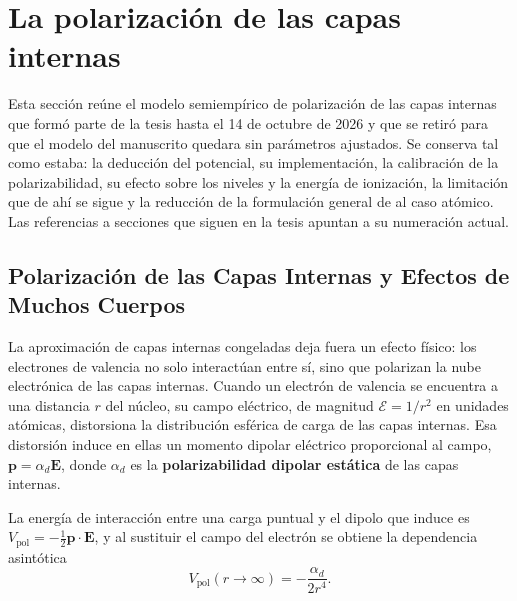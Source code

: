 
\section{La polarización de las capas internas}
\label{det:vpol}

Esta sección reúne el modelo semiempírico de polarización de las capas internas que formó parte de
la tesis hasta el 14 de octubre de 2026 y que se retiró para que el modelo del manuscrito quedara
sin parámetros ajustados. Se conserva tal como estaba: la deducción del potencial, su
implementación, la calibración de la polarizabilidad, su efecto sobre los niveles y la energía de
ionización, la limitación que de ahí se sigue y la reducción de la formulación general de
\textcite{Muller1984} al caso atómico. Las referencias a secciones que siguen en la tesis apuntan a
su numeración actual.

\subsection{Polarización de las Capas Internas y Efectos de Muchos Cuerpos}
\label{sec:core_polarization}

La aproximación de capas internas congeladas deja fuera un efecto físico: los electrones de valencia no solo interactúan entre sí, sino que polarizan la nube electrónica de las capas internas. Cuando un electrón de valencia se encuentra a una distancia $r$ del núcleo, su campo eléctrico, de magnitud $\mathcal{E} = 1/r^2$ en unidades atómicas, distorsiona la distribución esférica de carga de las capas internas. Esa distorsión induce en ellas un momento dipolar eléctrico proporcional al campo, $\mathbf{p} = \alpha_d \mathcal{\bm{E}}$, donde $\alpha_d$ es la \textbf{polarizabilidad dipolar estática} de las capas internas.

La energía de interacción entre una carga puntual y el dipolo que induce es $V_{\text{pol}} = -\frac{1}{2} \mathbf{p} \cdot \mathcal{\bm{E}}$, y al sustituir el campo del electrón se obtiene la dependencia asintótica
\begin{equation}
    V_{\text{pol}}(r \to \infty) = -\frac{\alpha_d}{2 r^4}.
\end{equation}

